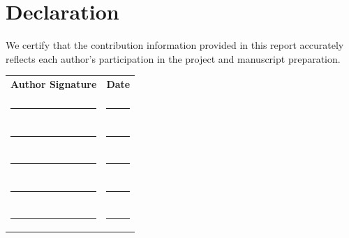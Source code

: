\documentclass[11pt,a4paper]{article}
\begin{document}
\section{Declaration}

We certify that the contribution information provided in this report accurately reflects each author's participation in the project and manuscript preparation.

\vspace{1cm}

\begin{tabular}{p{7cm}p{4cm}}
\textbf{Author Signature} & \textbf{Date} \\
\\[1.5cm]
\rule{6cm}{0.4pt} & \rule{3cm}{0.4pt} \\
\\[1.2cm]
\rule{6cm}{0.4pt} & \rule{3cm}{0.4pt} \\
\\[1.2cm]
\rule{6cm}{0.4pt} & \rule{3cm}{0.4pt} \\
\\[1.2cm]
\rule{6cm}{0.4pt} & \rule{3cm}{0.4pt} \\
\\[1.2cm]
\rule{6cm}{0.4pt} & \rule{3cm}{0.4pt} \\
\end{tabular}
\end{document}
